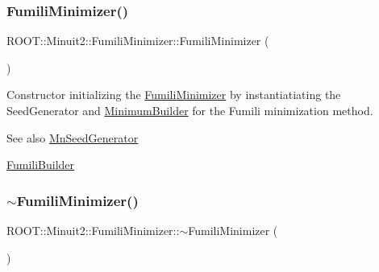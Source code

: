 \subsubsection{\texorpdfstring{FumiliMinimizer()}{FumiliMinimizer()}\hspace{0.1cm}{\footnotesize\ttfamily [1/3]}}
{\footnotesize\ttfamily R\+O\+O\+T\+::\+Minuit2\+::\+Fumili\+Minimizer\+::\+Fumili\+Minimizer (\begin{DoxyParamCaption}{ }\end{DoxyParamCaption})\hspace{0.3cm}{\ttfamily [inline]}}

Constructor initializing the \mbox{\hyperlink{classROOT_1_1Minuit2_1_1FumiliMinimizer}{Fumili\+Minimizer}} by instantiatiating the Seed\+Generator and \mbox{\hyperlink{classROOT_1_1Minuit2_1_1MinimumBuilder}{Minimum\+Builder}} for the Fumili minimization method.

\begin{DoxySeeAlso}{See also}
\mbox{\hyperlink{classROOT_1_1Minuit2_1_1MnSeedGenerator}{Mn\+Seed\+Generator}}

\mbox{\hyperlink{classROOT_1_1Minuit2_1_1FumiliBuilder}{Fumili\+Builder}} 
\end{DoxySeeAlso}
\mbox{\label{classROOT_1_1Minuit2_1_1FumiliMinimizer_a2e482171de26d153b98228aa41adee3e}} 
\subsubsection{\texorpdfstring{$\sim$FumiliMinimizer()}{~FumiliMinimizer()}\hspace{0.1cm}{\footnotesize\ttfamily [1/3]}}
{\footnotesize\ttfamily R\+O\+O\+T\+::\+Minuit2\+::\+Fumili\+Minimizer\+::$\sim$\+Fumili\+Minimizer (\begin{DoxyParamCaption}{ }\end{DoxyParamCaption})\hspace{0.3cm}{\ttfamily [inline]}}

\mbox{\label{classROOT_1_1Minuit2_1_1FumiliMinimizer_af33036073afd0161dbe9fd2fe0866575}} 

